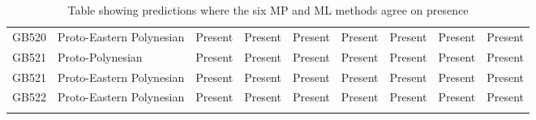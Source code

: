 \begin{longtable}{p{1.5cm}p{2.5cm}p{2.5cm}p{2.5cm}p{2.5cm}p{2.5cm}p{2.5cm}p{2.5cm}p{2.5cm}}
  GB520 & Proto-Eastern Polynesian & Present & Present & Present & Present & Present & Present & Present \\ 
  GB521 & Proto-Polynesian & Present & Present & Present & Present & Present & Present & Present \\ 
  GB521 & Proto-Eastern Polynesian & Present & Present & Present & Present & Present & Present & Present \\ 
  GB522 & Proto-Eastern Polynesian & Present & Present & Present & Present & Present & Present & Present \\ 
   \bottomrule
\caption{Table showing predictions where the six MP and ML methods agree on presence} 
\label{extra_predictions_table}
\end{longtable}
